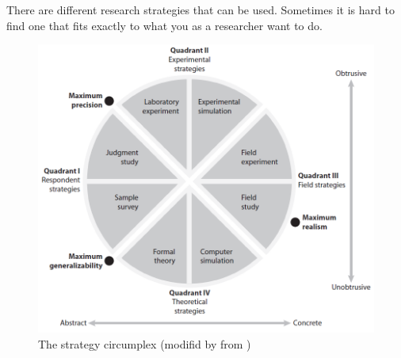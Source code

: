 There are different research strategies that can be used. Sometimes it is hard to find one that fits exactly to what you as a researcher want to do.
\begin{figure}
\begin{center}
\includegraphics[scale=0.5]{circumplex}
\caption[The strategy circumplex]{The strategy circumplex (modifid by \cite{alsos} from \cite{McGrath})}
\label{fig:circumplex}
\end{center}
\end{figure} 
